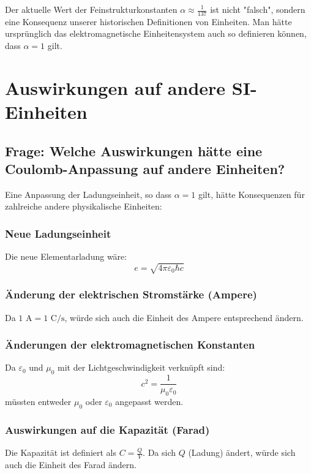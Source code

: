 \documentclass{article}
\begin{document}
Der aktuelle Wert der Feinstrukturkonstanten $\alpha \approx \frac{1}{137}$ ist nicht "falsch", sondern eine Konsequenz unserer historischen Definitionen von Einheiten. Man hätte ursprünglich das elektromagnetische Einheitensystem auch so definieren können, dass $\alpha = 1$ gilt.

\section{Auswirkungen auf andere SI-Einheiten}

\subsection{Frage: Welche Auswirkungen hätte eine Coulomb-Anpassung auf andere Einheiten?}

Eine Anpassung der Ladungseinheit, so dass $\alpha = 1$ gilt, hätte Konsequenzen für zahlreiche andere physikalische Einheiten:

\subsubsection{Neue Ladungseinheit}
Die neue Elementarladung wäre:
\begin{equation}
	e = \sqrt{4\pi\varepsilon_0\hbar c}
\end{equation}

\subsubsection{Änderung der elektrischen Stromstärke (Ampere)}
Da $1 \text{ A} = 1 \text{ C}/\text{s}$, würde sich auch die Einheit des Ampere entsprechend ändern.

\subsubsection{Änderungen der elektromagnetischen Konstanten}
Da $\varepsilon_0$ und $\mu_0$ mit der Lichtgeschwindigkeit verknüpft sind:
\begin{equation}
	c^2 = \frac{1}{\mu_0\varepsilon_0}
\end{equation}
müssten entweder $\mu_0$ oder $\varepsilon_0$ angepasst werden.

\subsubsection{Auswirkungen auf die Kapazität (Farad)}
Die Kapazität ist definiert als $C = \frac{Q}{V}$. Da sich $Q$ (Ladung) ändert, würde sich auch die Einheit des Farad ändern.
\end{document}
